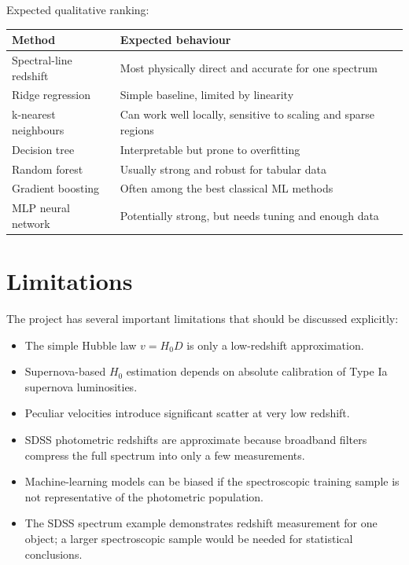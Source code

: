 \documentclass[11pt,a4paper]{article}
\begin{document}
Expected qualitative ranking:
\begin{center}
\begin{tabular}{ll}
\toprule
Method & Expected behaviour \\
\midrule
Spectral-line redshift & Most physically direct and accurate for one spectrum \\
Ridge regression & Simple baseline, limited by linearity \\
k-nearest neighbours & Can work well locally, sensitive to scaling and sparse regions \\
Decision tree & Interpretable but prone to overfitting \\
Random forest & Usually strong and robust for tabular data \\
Gradient boosting & Often among the best classical ML methods \\
MLP neural network & Potentially strong, but needs tuning and enough data \\
\bottomrule
\end{tabular}
\end{center}

\section{Limitations}

The project has several important limitations that should be discussed explicitly:

\begin{itemize}
    \item The simple Hubble law $v=H_0D$ is only a low-redshift approximation.
    \item Supernova-based $H_0$ estimation depends on absolute calibration of Type Ia supernova luminosities.
    \item Peculiar velocities introduce significant scatter at very low redshift.
    \item SDSS photometric redshifts are approximate because broadband filters compress the full spectrum into only a few measurements.
    \item Machine-learning models can be biased if the spectroscopic training sample is not representative of the photometric population.
    \item The SDSS spectrum example demonstrates redshift measurement for one object; a larger spectroscopic sample would be needed for statistical conclusions.
\end{itemize}
\end{document}

